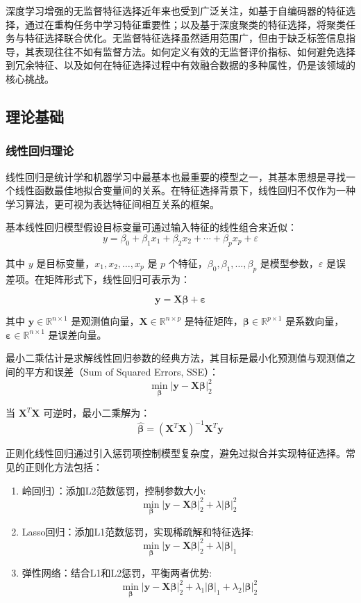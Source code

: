 \documentclass[12pt,a4paper,UTF8]{article}
\begin{document}
  深度学习增强的无监督特征选择近年来也受到广泛关注，如基于自编码器的特征选择，通过在重构任务中学习特征重要性；以及基于深度聚类的特征选择，将聚类任务与特征选择联合优化。无监督特征选择虽然适用范围广，但由于缺乏标签信息指导，其表现往往不如有监督方法。如何定义有效的无监督评价指标、如何避免选择到冗余特征、以及如何在特征选择过程中有效融合数据的多种属性，仍是该领域的核心挑战。
  
  \subsection{理论基础}
  \subsubsection{线性回归理论}
  线性回归是统计学和机器学习中最基本也最重要的模型之一，其基本思想是寻找一个线性函数最佳地拟合变量间的关系。在特征选择背景下，线性回归不仅作为一种学习算法，更可视为表达特征间相互关系的框架。
  
  基本线性回归模型假设目标变量可通过输入特征的线性组合来近似：
  $$
  y = \beta_0 + \beta_1 x_1 + \beta_2 x_2 + \cdots + \beta_p x_p + \varepsilon
  $$
  
  
  其中 $y$ 是目标变量，$x_1, x_2, \ldots, x_p$ 是 $p$ 个特征，$\beta_0, \beta_1, \ldots, \beta_p$ 是模型参数，$\varepsilon$ 是误差项。在矩阵形式下，线性回归可表示为：
  
  $$\mathbf{y} = \mathbf{X}\boldsymbol{\beta} + \boldsymbol{\varepsilon}$$
  
  其中 $\mathbf{y} \in \mathbb{R}^{n \times 1}$ 是观测值向量，$\mathbf{X} \in \mathbb{R}^{n \times p}$ 是特征矩阵，$\boldsymbol{\beta} \in \mathbb{R}^{p \times 1}$ 是系数向量，$\boldsymbol{\varepsilon} \in \mathbb{R}^{n \times 1}$ 是误差向量。
  
  最小二乘估计是求解线性回归参数的经典方法，其目标是最小化预测值与观测值之间的平方和误差（Sum of Squared Errors, SSE）：
  $$
  \min_{\boldsymbol{\beta}} |\mathbf{y} - \mathbf{X}\boldsymbol{\beta}|_2^2
  $$
  
  
  当 $\mathbf{X}^T\mathbf{X}$ 可逆时，最小二乘解为：
  $$
  \hat{\boldsymbol{\beta}} = (\mathbf{X}^T\mathbf{X})^{-1}\mathbf{X}^T\mathbf{y}
  $$
  
  
  正则化线性回归通过引入惩罚项控制模型复杂度，避免过拟合并实现特征选择。常见的正则化方法包括：
  \begin{enumerate}
  	\item 岭回归）：添加L2范数惩罚，控制参数大小: $$\min_{\boldsymbol{\beta}} |\mathbf{y} - \mathbf{X}\boldsymbol{\beta}|_2^2 + \lambda|\boldsymbol{\beta}|_2^2$$
  	\item Lasso回归：添加L1范数惩罚，实现稀疏解和特征选择: $$\min_{\boldsymbol{\beta}} |\mathbf{y} - \mathbf{X}\boldsymbol{\beta}|_2^2 + \lambda|\boldsymbol{\beta}|_1$$
  	\item  弹性网络：结合L1和L2惩罚，平衡两者优势: $$\min_{\boldsymbol{\beta}} |\mathbf{y} - \mathbf{X}\boldsymbol{\beta}|_2^2 + \lambda_1|\boldsymbol{\beta}|_1 + \lambda_2|\boldsymbol{\beta}|_2^2$$
  \end{enumerate}
  
\end{document}
